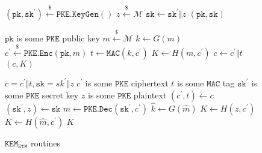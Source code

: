 \documentclass[journal=tches,submission]{iacrtrans}
\newcommand{\pke}{\texttt{PKE}}
\newcommand{\keygen}{\texttt{KeyGen}}
\newcommand{\encrypt}{\texttt{Enc}}
\newcommand{\decrypt}{\texttt{Dec}}
\newcommand{\kem}{\texttt{KEM}}
\newcommand{\encap}{\texttt{Encap}}
\newcommand{\decap}{\texttt{Decap}}
\newcommand{\etm}{\texttt{EtM}}  %
\newcommand{\mac}{\texttt{MAC}}
\newcommand{\pk}{\texttt{pk}}
\newcommand{\sk}{\texttt{sk}}
\newcommand{\leftsample}{\stackrel{\$}{\leftarrow}}
\begin{document}
\begin{figure}[H]
    \centering
    \begin{minipage}[t]{0.5\textwidth}
        \begin{algorithm}[H]
            \caption*{$\kem_\etm.\keygen()$}
            \begin{algorithmic}[1]
                \State $(\pk, \sk^\prime) \leftsample \pke\texttt{.}\keygen()$
                \State $z \leftsample \mathcal{M}$
                \State $\sk \leftarrow \sk^\prime \Vert z$
                \State \Return $(\pk, \sk)$
            \end{algorithmic}
        \end{algorithm}
        \begin{algorithm}[H]
            \caption*{$\kem_\etm.\encap(\pk)$}
            \begin{algorithmic}[1]
                \Ensure $\pk$ is some $\pke$ public key
                \State $m \leftsample \mathcal{M}$
                \State $k \leftarrow G(m)$
                \State $c^\prime \leftsample \pke\texttt{.}\encrypt(\pk, m)$
                \State $t \leftarrow \mac(k, c^\prime)$
                \State $K \leftarrow H(m, c^\prime)$
                \State $c \leftarrow c^\prime \Vert t$
                \State \Return $(c, K)$
            \end{algorithmic}
        \end{algorithm}
    \end{minipage}\hfill
    \begin{minipage}[t]{0.49\textwidth}
        \begin{algorithm}[H]
            \caption*{$\kem_\etm.\decap(\sk, c)$}
            \begin{algorithmic}[1]
                \Require $c = c^\prime \Vert t, \sk = sk^\prime \Vert z$
                \Ensure $c^\prime$ is some $\pke$ ciphertext
                \Ensure $t$ is some $\mac$ tag
                \Ensure $\sk^\prime$ is some $\pke$ secret key
                \Ensure $z$ is some $\pke$ plaintext
                \State $(c^\prime, t) \leftarrow c$
                \State $(\sk^\prime, z) \leftarrow \sk$
                \State $\hat{m} \leftarrow \pke\texttt{.}\decrypt(\sk^\prime, c^\prime)$
                \State $\hat{k} \leftarrow G(\hat{m})$
                \If{$\mac(\hat{k}, c^\prime) \neq t$}
                    \State $K \leftarrow H(z, c^\prime)$
                \Else
                    \State $K \leftarrow H(\hat{m}, c^\prime)$
                \EndIf
                \State \Return $K$
            \end{algorithmic}
        \end{algorithm}
    \end{minipage}
    \caption{$\kem_\etm$ routines}\label{fig:etm-routines} 
\end{figure}
\end{document}
